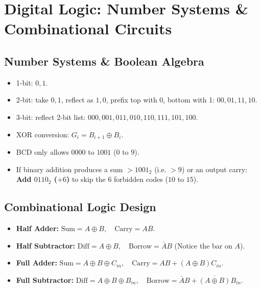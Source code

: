 \chapter{Digital Logic: Number Systems \& Combinational Circuits}

\section{Number Systems \& Boolean Algebra}
\begin{trickbox}
\begin{itemize}[leftmargin=*]
    \item 1-bit: $0, 1$.
    \item 2-bit: take $0, 1$, reflect as $1, 0$, prefix top with 0, bottom with 1: $00, 01, 11, 10$.
    \item 3-bit: reflect 2-bit list: $000, 001, 011, 010, 110, 111, 101, 100$.
    \item XOR conversion: $G_i = B_{i+1} \oplus B_i$.
\end{itemize}
\end{trickbox}

\begin{notebox}
\begin{itemize}[leftmargin=*]
    \item BCD only allows $0000$ to $1001$ ($0$ to $9$).
    \item If binary addition produces a sum $> 1001_2$ (i.e. $> 9$) or an output carry: \textbf{Add $0110_2$ ($+6$)} to skip the 6 forbidden codes ($10$ to $15$).
\end{itemize}
\end{notebox}

\section{Combinational Logic Design}
\begin{notebox}
\begin{itemize}[leftmargin=*]
    \item \textbf{Half Adder:} $\text{Sum} = A \oplus B, \quad \text{Carry} = AB$.
    \item \textbf{Half Subtractor:} $\text{Diff} = A \oplus B, \quad \text{Borrow} = \bar{A}B$ (Notice the bar on $A$).
    \item \textbf{Full Adder:} $\text{Sum} = A \oplus B \oplus C_{in}, \quad \text{Carry} = AB + (A \oplus B)C_{in}$.
    \item \textbf{Full Subtractor:} $\text{Diff} = A \oplus B \oplus B_{in}, \quad \text{Borrow} = \bar{A}B + \overline{(A \oplus B)}B_{in}$.
\end{itemize}
\end{notebox}

